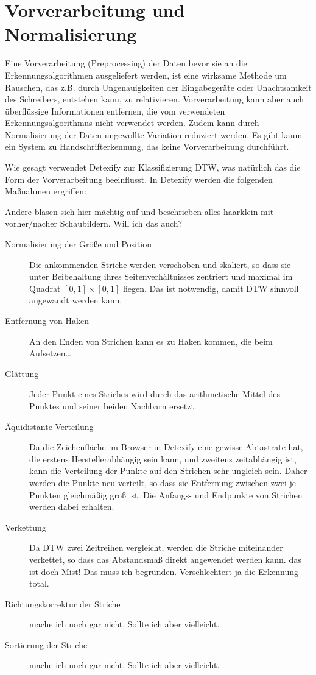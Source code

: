 \section{Vorverarbeitung und Normalisierung} 

\label{sec:vorverarbeitung}

Eine Vorverarbeitung (Preprocessing) der Daten bevor sie an die Erkennungsalgorithmen ausgeliefert werden, ist eine wirksame Methode um Rauschen, das z.B. durch Ungenauigkeiten der Eingabegeräte oder Unachtsamkeit des Schreibers, entstehen kann, zu relativieren. Vorverarbeitung kann aber auch überflüssige Informationen entfernen, die vom verwendeten Erkennungsalgorithmus nicht verwendet werden. Zudem kann durch Normalisierung der Daten ungewollte Variation reduziert werden. Es gibt kaum ein System zu Handschrifterkennung, das keine Vorverarbeitung durchführt.

Wie gesagt verwendet Detexify zur Klassifizierung \ac{DTW}, was natürlich das die Form der Vorverarbeitung beeinflusst. In Detexify werden die folgenden Maßnahmen ergriffen:

\TODO Andere blasen sich hier mächtig auf und beschrieben alles haarklein mit vorher/nacher Schaubildern. Will ich das auch?

\begin{description}
  \item[Normalisierung der Größe und Position] Die ankommenden Striche werden verschoben und skaliert, so dass sie unter Beibehaltung ihres Seitenverhältnisses zentriert und maximal im Quadrat $[0,1]\times[0,1]$ liegen. Das ist notwendig, damit \ac{DTW} sinnvoll angewandt werden kann.
  \item[Entfernung von Haken]
  \TODO An den Enden von Strichen kann es zu Haken kommen, die beim Aufsetzen\dots
  \item[Glättung] Jeder Punkt eines Striches wird durch das arithmetische Mittel des Punktes und seiner beiden Nachbarn ersetzt. 
  \item[Äquidistante Verteilung] Da die Zeichenfläche im Browser in Detexify eine gewisse Abtastrate hat, die erstens Herstellerabhängig sein kann, und zweitens zeitabhängig ist, kann die Verteilung der Punkte auf den Strichen sehr ungleich sein. Daher werden die Punkte neu verteilt, so dass sie Entfernung zwischen zwei je Punkten gleichmäßig groß ist. Die Anfangs- und Endpunkte von Strichen werden dabei erhalten. 
  \item[Verkettung] Da \ac{DTW} zwei Zeitreihen vergleicht, werden die Striche miteinander verkettet, so dass das Abstandsmaß direkt angewendet werden kann. \TODO das ist doch Mist! Das muss ich begründen. Verschlechtert ja die Erkennung total. 
  \item[Richtungskorrektur der Striche] \TODO mache ich noch gar nicht. Sollte ich aber vielleicht. 
  \item[Sortierung der Striche] \TODO mache ich noch gar nicht. Sollte ich aber vielleicht.
\end{description}

